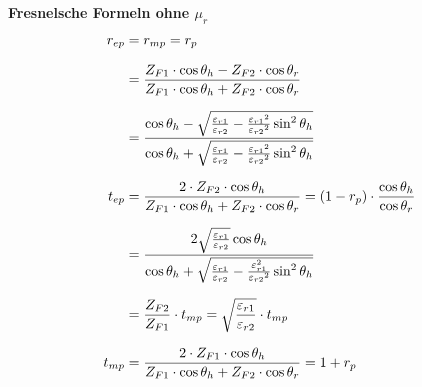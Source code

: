 \textbf{Fresnelsche Formeln ohne $\mu_r$}
\begin{equation*}
		\setlength{\jot}{10pt}
	\begin{aligned}
		r_{ep}    & =  r_{mp} = r_{p} 
		\\
		& = \frac{Z_{F1} \cdot \cos \theta_h-Z_{F2} \cdot \cos \theta_r}{Z_{F1} \cdot \cos \theta_h+Z_{F2} \cdot \cos \theta_r}
		\\
		& =\frac{\cos \theta_h-\sqrt{\frac{\varepsilon_{r 1}}{\varepsilon_{r 2}}-\frac{\varepsilon_{r 1}{ }^2}{\varepsilon_{r 2}{ }^2} \sin ^2 \theta_h}}{\cos \theta_h+\sqrt{\frac{\varepsilon_{r 1}}{\varepsilon_{r 2}}-\frac{\varepsilon_{r 1}{ }^2}{\varepsilon_{r 2}{ }^2} \sin ^2 \theta_h}} \\
		t_{ep} & =  \frac{2 \cdot Z_{F2}   \cdot  \cos \theta_h}{Z_{F1} \cdot \cos \theta_h+Z_{F2} \cdot \cos \theta_r}                                                                                                                           = (1-r_p) \cdot \dfrac{\cos \theta_h}{\cos \theta_r}                                                                                                                                                                        \\
		& = \frac{2 \sqrt{\frac{\varepsilon_{r 1}}{\varepsilon_{r 2}}} \cos \theta_h}{\cos \theta_h+\sqrt{\frac{\varepsilon_{r 1}}{\varepsilon_{r 2}}-\frac{\varepsilon_{r 1}^2}{\varepsilon_{r 2}{ }^2} \sin ^2 \theta_h}} \\
		& = \frac{Z_{F2}}{Z_{F1}}\cdot t_{mp} = \sqrt{\frac{\varepsilon_{r1}}{\varepsilon_{r2}}}\cdot t_{mp} \\
		t_{mp} & = \frac{2 \cdot  Z_{F1}\cdot \cos \theta_h}{Z_{F1} \cdot \cos \theta_h+Z_{F2} \cdot \cos \theta_r}                                                                                                                          
		= 1+r_p                                                                                                                                                                                                                
	\end{aligned}
\end{equation*}

